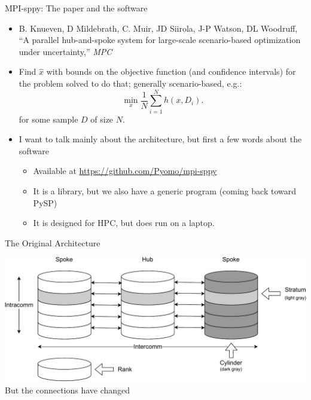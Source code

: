 \documentclass[9pt,usenames,dvipsnames]{beamer}
\begin{document}
\begin{frame}{MPI-sppy: The paper and the software}
\begin{itemize}
\item B. Knueven, D Mildebrath, C. Muir, JD Siirola, J-P Watson, DL Woodruff, ``A parallel hub-and-spoke system for large-scale scenario-based optimization under uncertainty,'' {\em MPC}
\item Find $\hat{x}$ with bounds on the objective function (and confidence intervals) for the problem solved to do that; generally scenario-based, e.g.:
  $$
   \min_x \frac{1}{N} \sum_{i=1}^N h(x, D_i).
   $$
   for some sample $D$ of size $N$.
\item I want to talk mainly about the architecture, but first a few words about the software 
  \begin{itemize}
  \item Available at \url{https://github.com/Pyomo/mpi-sppy}
  \item It is a library, but we also have a generic program (coming back toward PySP)
    \item It is designed for HPC, but does run on a laptop.
    \end{itemize}
\end{itemize}
\end{frame}

\begin{frame}{The Original Architecture}
  \subtitle{MPI: Message Passing Interface}

\includegraphics[width=1.0\linewidth]{hubspoke.pdf}
But the connections have changed
\end{frame}
\end{document}
